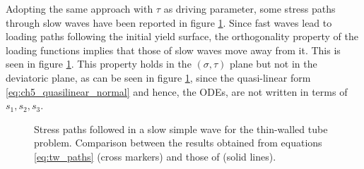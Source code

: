 Adopting the same approach with $\tau$ as driving parameter, some stress paths through slow waves have been reported in figure \ref{fig:tw_slow}.
Since fast waves lead to loading paths following the initial yield surface, the orthogonality property of the loading functions implies that those of slow waves move away from it.
This is seen in figure \ref{fig:tw_slow}.
This property holds in the $(\sigma,\tau)$ plane but not in the deviatoric plane, as can be seen in figure \ref{fig:tw_slow}, since the quasi-linear form \eqref{eq:ch5_quasilinear_normal} and hence, the ODEs, are not written in terms of $s_1,s_2,s_3$.
\begin{figure}[h!]
  \centering
   \qquad
  \caption{Stress paths followed in a slow simple wave for the thin-walled tube problem. Comparison between the results obtained from equations \eqref{eq:tw_paths} (cross markers) and those of \cite{Clifton} (solid lines).}
  \label{fig:tw_slow}
\end{figure}



